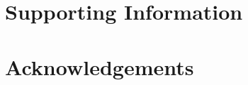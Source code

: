 \documentclass[10pt,letterpaper]{article}
\begin{document}
\section*{Supporting Information}



\section*{Acknowledgements}

\nolinenumbers

%
%


\end{document}
